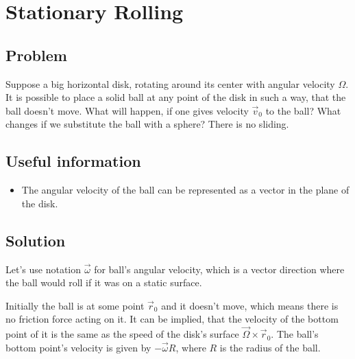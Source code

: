 \section*{Stationary Rolling}

\subsection*{Problem}

Suppose a big horizontal disk,
rotating around its center with angular velocity $\Omega$.
It is possible to place a solid ball at any point of the disk
in such a way, that the ball doesn't move.
What will happen, if one gives velocity $\vec{v}_0$ to the ball?
What changes if we substitute the ball with a sphere?
There is no sliding.

\subsection*{Useful information}
\begin{itemize}
    \item The angular velocity of the ball can be represented as
        a vector in the plane of the disk.
\end{itemize}

\subsection*{Solution}

Let's use notation $\vec{\omega}$ for ball's angular velocity,
which is a vector direction where the ball would roll
if it was on a static surface.

Initially the ball is at some point $\vec{r}_0$ and it doesn't move,
which means there is no friction force acting on it.
It can be implied, that the velocity of the bottom point of it
is the same as the speed of the disk's surface $\vec{\Omega} \times \vec{r}_0$.
The ball's bottom point's velocity is given by $-\vec{\omega} R$,
where $R$ is the radius of the ball.

